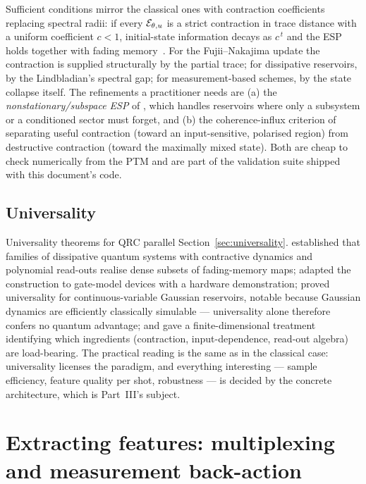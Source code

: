 Sufficient conditions mirror the classical ones with contraction coefficients
replacing spectral radii: if every $\mathcal{E}_{\theta,u}$ is a strict
contraction in trace distance with a uniform coefficient $c<1$, initial-state
information decays as $c^{\,t}$ and the ESP holds together with fading
memory~\citep{chen2019learning,chen2020temporal,martinez2023finite}. For the
Fujii--Nakajima update the contraction is supplied structurally by the partial
trace; for dissipative reservoirs, by the Lindbladian's spectral gap; for
measurement-based schemes, by the state collapse itself. The refinements a
practitioner needs are (a) the \emph{nonstationary/subspace ESP} of
\citet{kobayashi2024extending}, which handles reservoirs where only a
subsystem or a conditioned sector must forget, and (b) the coherence-influx
criterion of \citet{kobayashi2024coherence} separating useful contraction
(toward an input-sensitive, polarised region) from destructive contraction
(toward the maximally mixed state). Both are cheap to check numerically from
the PTM and are part of the validation suite shipped with this document's code.

\subsection{Universality}
\label{sec:qrc-universality}

Universality theorems for QRC parallel Section~\ref{sec:universality}.
\citet{chen2019learning} established that families of dissipative quantum
systems with contractive dynamics and polynomial read-outs realise dense
subsets of fading-memory maps; \citet{chen2020temporal} adapted the
construction to gate-model devices with a hardware demonstration;
\citet{nokkala2021gaussian} proved universality for continuous-variable
Gaussian reservoirs, notable because Gaussian dynamics are efficiently
classically simulable --- universality alone therefore confers no quantum
advantage; and \citet{martinez2023finite} gave a finite-dimensional treatment
identifying which ingredients (contraction, input-dependence, read-out
algebra) are load-bearing. The practical reading is the same as in the
classical case: universality licenses the paradigm, and everything
interesting --- sample efficiency, feature quality per shot, robustness ---
is decided by the concrete architecture, which is Part~III's subject.

\section{Extracting features: multiplexing and measurement back-action}
\label{sec:extraction}

